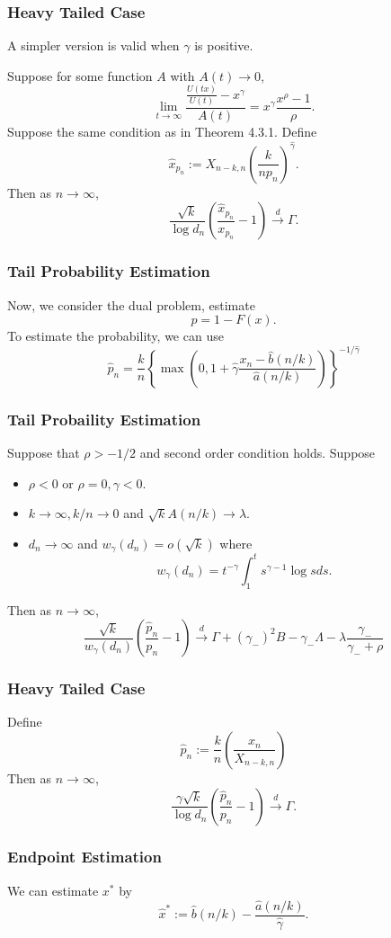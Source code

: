 \documentclass{beamer}
\begin{document}
\begin{frame}
    \frametitle{Heavy Tailed Case}
    A simpler version is valid when $\gamma$ is positive.

    Suppose for some function $A$ with $A(t)\to 0$,
    $$
\lim_{t\to \infty} \dfrac{\frac{U(tx)}{U(t)}-x^{\gamma}}{A(t)}=x^{\gamma} \dfrac{x^{\rho}-1}{\rho}.
    $$
    Suppose the same condition as in Theorem 4.3.1. Define
    $$
\hat{x}_{p_n}:=X_{n-k,n}\left(\dfrac{k}{np_n}\right)^{\hat{\gamma}}.
    $$
Then as $n \to \infty$,
$$
\dfrac{\sqrt{k}}{\log d_n}\left(\dfrac{\hat{x}_{p_n}}{x_{p_n}}-1\right)\stackrel{d}{\to} \Gamma.
$$
    

\end{frame}
\begin{frame}
    \frametitle{Tail Probability Estimation}

    Now, we consider the dual problem, estimate 
    $$
    p = 1-F(x).
    $$
    To estimate the probability, we can use 
    $$
    \hat{p}_n = \dfrac{k}{n} \left\{\max\left(0, 1+\hat{\gamma} \dfrac{x_n-\hat{b}(n/k)}{\hat{a}(n/k)}    \right)\right\}^{-1/\hat{\gamma}}
    $$    

\end{frame}


\begin{frame}
    \frametitle{Tail Probaility Estimation}
Suppose that $\rho>-1/2$ and second order condition holds. Suppose
\begin{itemize}
    \item $\rho<0$ or $\rho=0,\gamma<0$.
    \item $k\to \infty, k/n \to 0$ and $\sqrt{k}A(n/k)\to \lambda$.
    \item $d_n\to \infty$ and $w_{\gamma}(d_n)=o(\sqrt{k})$ where
        $$
        w_{\gamma}(d_n)=t^{-\gamma}\int_{1}^{t} s^{\gamma-1}\log sds.
        $$
\end{itemize}
Then as $n \to \infty$,
$$
\dfrac{\sqrt{k}}{w_{\gamma}(d_n)}\left(\dfrac{\hat{p}_n}{p_n}-1\right)\stackrel{d}{\to} \Gamma + (\gamma_{-})^2B -{\gamma_{-}}\Lambda -\lambda \dfrac{\gamma_{-}}{\gamma_{-}+\rho}
$$
\end{frame}

\begin{frame}
    \frametitle{Heavy Tailed Case}
    Define 
$$
\hat{p}_n:=\dfrac{k}{n}\left(\dfrac{x_n}{X_{n-k,n}}\right)
$$
Then as $n \to \infty$,
$$
\dfrac{\gamma \sqrt{k}}{\log d_n}\left(\dfrac{\hat{p}_n}{p_n}-1\right)\stackrel{d}{\to}\Gamma.
$$
    

\end{frame}
\begin{frame}
    \frametitle{Endpoint Estimation}
We can estimate $x^*$ by 
$$
\hat{x}^*:=\hat{b}(n/k)-\dfrac{\hat{a}(n/k)}{\hat{\gamma}}.
$$
    

\end{frame}
\end{document}

